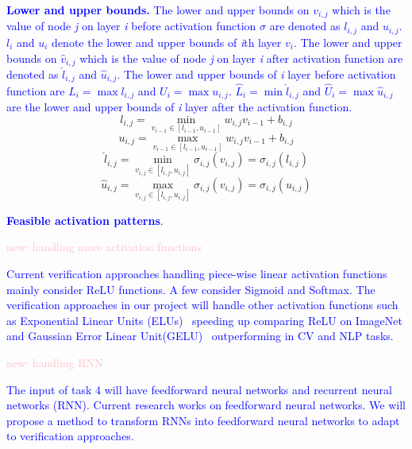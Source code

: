 \textcolor{blue}{\textbf{Lower and upper bounds.} The lower and upper bounds on $v_{i,j}$ which is the value of node \emph{j} on layer \emph{i} before activation function $\sigma$ are denoted as $l_{i,j}$ and $u_{i,j}$. $l_i$ and $u_i$ denote the lower and upper bounds of \emph{i}th layer $v_i$. The lower and upper bounds on $\hat{v}_{i,j}$ which is the value of node \emph{j} on layer \emph{i} after activation function are denoted as $\hat{l}_{i,j}$ and $\hat{u}_{i,j}$. The lower and upper bounds of \emph{i} layer before activation function are $L_i=\max l_{i,j}$ and $U_i=\max u_{i,j}$. $\hat{L}_i=\min \hat{l}_{i,j}$ and $\hat{U}_i=\max\hat{u}_{i,j}$ are the lower and upper bounds of \emph{i} layer after the activation function. }
\begin{equation}
    l_{i,j}= \min_{v_{i-1}\in [ l_{i-1}, u_{i-1} ]  } w_{i,j} v_{i-1} +b_{i,j}
\end{equation}
\begin{equation}
    u_{i,j}= \max_{v_{i-1}\in \left [ l_{i-1}, u_{i-1} \right ]  } w_{i,j} v_{i-1} +b_{i,j}
\end{equation}
\begin{equation}
    \hat{l}_{i,j}= \min_{v_{i,j}\in \left [ l_{i,j}, u_{i,j} \right ]  } \sigma_{i,j} (v_{i,j})=\sigma_{i,j}(l_{i,j})
\end{equation}
\begin{equation}
    \hat{u}_{i,j}= \max_{v_{i,j}\in \left [ l_{i,j}, u_{i,j} \right ]  } \sigma_{i,j} (v_{i,j})=\sigma_{i,j}(u_{i,j})
\end{equation}

\textcolor{blue}{\textbf{Feasible activation patterns}.}

\textcolor{pink}{new: handling more activation functions}

\textcolor{blue}{ Current verification approaches handling piece-wise linear activation functions mainly consider ReLU functions. A few consider Sigmoid and Softmax. The verification approaches in our project will handle other activation functions such as Exponential Linear Units (ELUs)~\cite{clevert2015fast} speeding up comparing ReLU on ImageNet and Gaussian Error Linear Unit(GELU)~\cite{hendrycks2016gaussian} outperforming in CV and NLP tasks. }

\textcolor{pink}{new: handling RNN}

\textcolor{blue}{The input of task 4 will have feedforward neural networks and recurrent neural networks (RNN). Current research works on feedforward neural networks. We will propose a method to transform RNNs into feedforward neural networks to adapt to verification approaches.}




